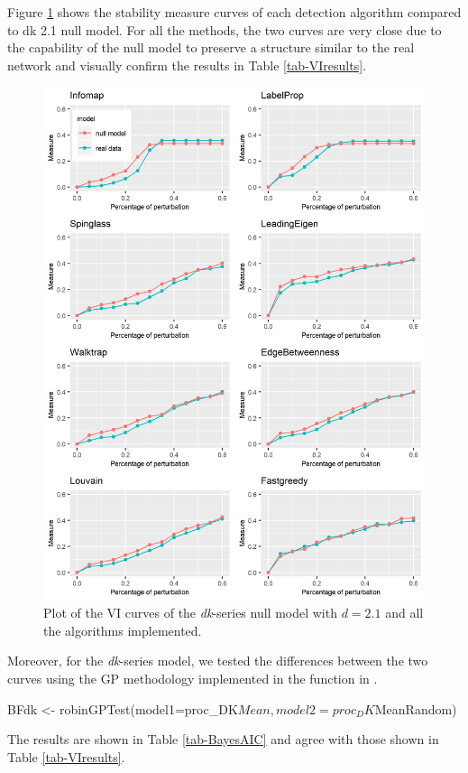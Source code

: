 Figure \ref{fig:PlotDkModel} shows the stability measure curves of each detection algorithm compared to dk 2.1 null model. For all the methods, the two curves are very close due to the capability of the null model to preserve a structure similar to the real network and visually confirm the results in Table \ref{tab-VIresults}.
\begin{figure}[h!]
\centering
\includegraphics[width=14cm]{PlotDkModel.png}
\caption{Plot of the VI curves of the  {\it dk}-series null model with $d=2.1$ and all the algorithms implemented.}
\label{fig:PlotDkModel}
\end{figure}

Moreover, for the {\it dk}-series model, we tested the differences between the two curves using the GP methodology implemented in the function in .

\begin{example}

BFdk <- robinGPTest(model1=proc_DK$Mean, model2=proc_DK$MeanRandom)

\end{example}
The results are shown in Table \ref{tab-BayesAIC} and agree with those shown in Table \ref{tab-VIresults}. 

